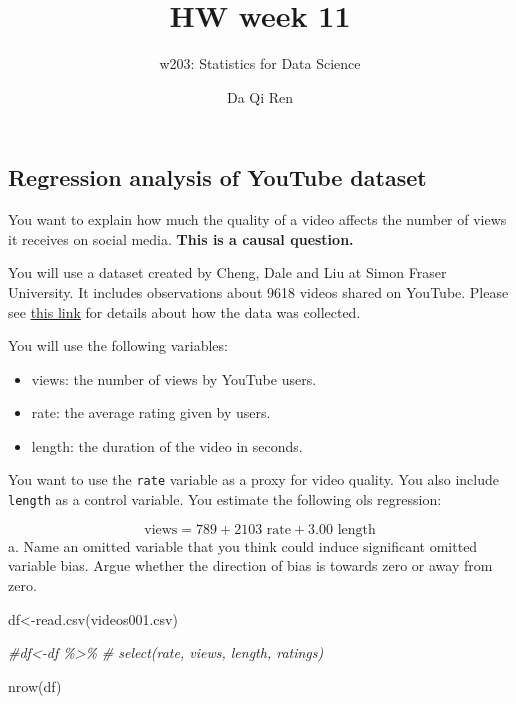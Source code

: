 \documentclass[
]{article}
\title{HW week 11}
\subtitle{w203: Statistics for Data Science}
\author{Da Qi Ren}
\date{}
\newenvironment{Shaded}{\begin{snugshade}}{\end{snugshade}}
\newcommand{\CommentTok}[1]{\textcolor[rgb]{0.56,0.35,0.01}{\textit{#1}}}
\newcommand{\FunctionTok}[1]{\textcolor[rgb]{0.00,0.00,0.00}{#1}}
\newcommand{\NormalTok}[1]{#1}
\newcommand{\OtherTok}[1]{\textcolor[rgb]{0.56,0.35,0.01}{#1}}
\newcommand{\StringTok}[1]{\textcolor[rgb]{0.31,0.60,0.02}{#1}}
\begin{document}
\maketitle

\newcommand{\E}{\text{E}}
\newcommand{\V}{\text{V}}
\newcommand{\R}{\mathbb{R}}
\newcommand{\Cov}{\mathbb{\text{Cov}}}

\hypertarget{regression-analysis-of-youtube-dataset}{%
\subsection{Regression analysis of YouTube
dataset}\label{regression-analysis-of-youtube-dataset}}

You want to explain how much the quality of a video affects the number
of views it receives on social media. \textbf{This is a causal
question.}

You will use a dataset created by Cheng, Dale and Liu at Simon Fraser
University. It includes observations about 9618 videos shared on
YouTube. Please see \href{http://netsg.cs.sfu.ca/youtubedata/}{this
link} for details about how the data was collected.

You will use the following variables:

\begin{itemize}
\item
  views: the number of views by YouTube users.
\item
  rate: the average rating given by users.
\item
  length: the duration of the video in seconds.
\end{itemize}

You want to use the \texttt{rate} variable as a proxy for video quality.
You also include \texttt{length} as a control variable. You estimate the
following ols regression:

\[\text{views} =   789 +  2103    \text{ rate} +      3.00 \text{ length} \]
a. Name an omitted variable that you think could induce significant
omitted variable bias. Argue whether the direction of bias is towards
zero or away from zero.

\begin{Shaded}
\begin{Highlighting}[]
\NormalTok{df}\OtherTok{\textless{}{-}}\FunctionTok{read.csv}\NormalTok{(}\StringTok{\textquotesingle{}videos001.csv\textquotesingle{}}\NormalTok{)}

\CommentTok{\#df\textless{}{-}df \%\textgreater{}\% }
\CommentTok{\#  select(\textquotesingle{}rate\textquotesingle{}, \textquotesingle{}views\textquotesingle{}, \textquotesingle{}length\textquotesingle{}, \textquotesingle{}ratings\textquotesingle{}) }

\FunctionTok{nrow}\NormalTok{(df)}
\end{Highlighting}
\end{Shaded}
\end{document}
